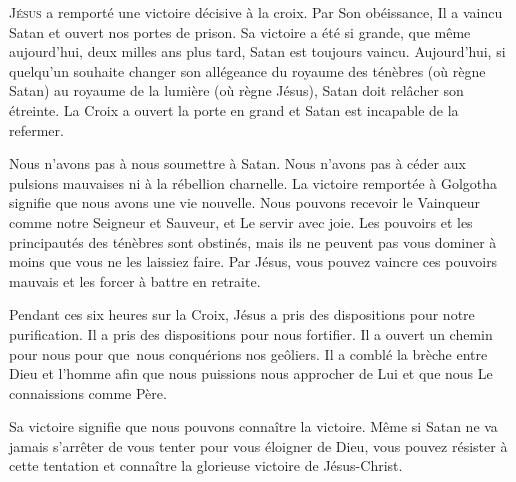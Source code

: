\lettrine{J}{ésus} a remporté une victoire décisive à la croix.
 Par Son obéissance, Il a vaincu Satan et ouvert nos portes de prison.
 Sa victoire a été si grande, que même aujourd'hui, deux milles ans plus tard,
 Satan est toujours vaincu. Aujourd'hui, si quelqu'un souhaite changer
 son allégeance du royaume des ténèbres (où règne Satan)
 au royaume de la lumière (où règne Jésus), Satan doit relâcher son étreinte.
 La Croix  a ouvert la porte en grand
 \ocadr et Satan est incapable de la refermer.


Nous n'avons pas à nous soumettre à Satan. Nous n'avons pas à céder
 aux pulsions mauvaises ni à la rébellion charnelle.
 La victoire remportée à Golgotha  signifie que
 nous avons une vie nouvelle. Nous pouvons recevoir le Vainqueur
 comme notre Seigneur et Sauveur, et Le servir avec joie.
 Les pouvoirs et les principautés des ténèbres sont obstinés,
 mais ils ne peuvent pas vous dominer à moins que vous ne les laissiez faire.
 Par Jésus, vous pouvez vaincre ces pouvoirs mauvais et les forcer
 à battre en retraite.

Pendant ces six heures sur la Croix, Jésus a pris des dispositions
 pour notre purification. Il a pris des dispositions pour nous fortifier.
 Il a ouvert un chemin pour nous pour que~nous conquérions nos geôliers.
 Il a comblé la brèche entre Dieu et l'homme afin que nous puissions
 nous approcher de Lui et que nous Le connaissions comme Père.

Sa victoire signifie que nous pouvons connaître la victoire.
 Même si Satan ne va jamais s'arrêter de vous tenter pour vous éloigner
 de Dieu, vous pouvez résister à cette tentation et connaître
 la glorieuse victoire de Jésus-Christ. 

\dvrule






